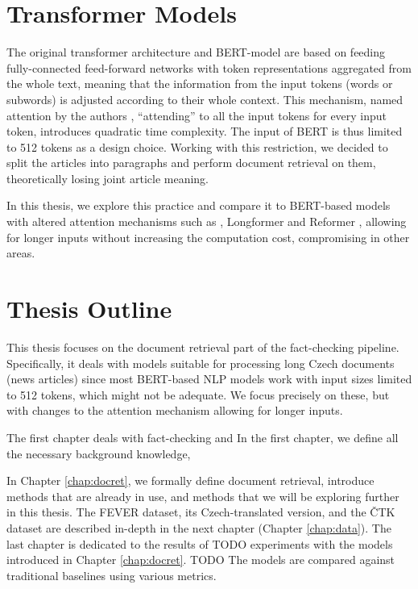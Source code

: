 \section*{Transformer Models}

The original transformer architecture \citep{attention-is-all-you-need} and BERT-model \citep{bert} are based on feeding fully-connected feed-forward networks with token representations aggregated from the whole text, meaning that the information from the input tokens (words or subwords) is adjusted according to their whole context. 
This mechanism, named attention by the authors \citep{attention-is-all-you-need}, ``attending'' to all the input tokens for every input token, introduces quadratic time complexity. 
The input of BERT is thus limited to 512 tokens as a design choice.
Working with this restriction, we decided to split the \CTK{} articles into paragraphs and perform document retrieval on them, theoretically losing joint article meaning.

In this thesis, we explore this practice and compare it to BERT-based models with altered attention mechanisms such as \nystr{} \citep{nystrom}, Longformer \citep{longformer} and Reformer \citep{reformer}, allowing for longer inputs without increasing the computation cost, compromising in other areas.

\section*{Thesis Outline}

This thesis focuses on the document retrieval part of the fact-checking pipeline.
Specifically, it deals with models suitable for processing long Czech documents (news articles) since most BERT-based NLP models work with input sizes limited to 512 tokens, which might not be adequate.
We focus precisely on these, but with changes to the attention mechanism allowing for longer inputs.

The first chapter deals with fact-checking and 
In the first chapter, we define all the necessary background knowledge, 

In Chapter \ref{chap:docret}, we formally define document retrieval, introduce methods that are already in use, and methods that we will be exploring further in this thesis. 
The FEVER dataset, its Czech-translated version, and the ČTK dataset are described in-depth in the next chapter (Chapter \ref{chap:data}).
The last chapter is dedicated to the results of TODO experiments with the models introduced in Chapter \ref{chap:docret}.
TODO The models are compared against traditional baselines using various metrics.